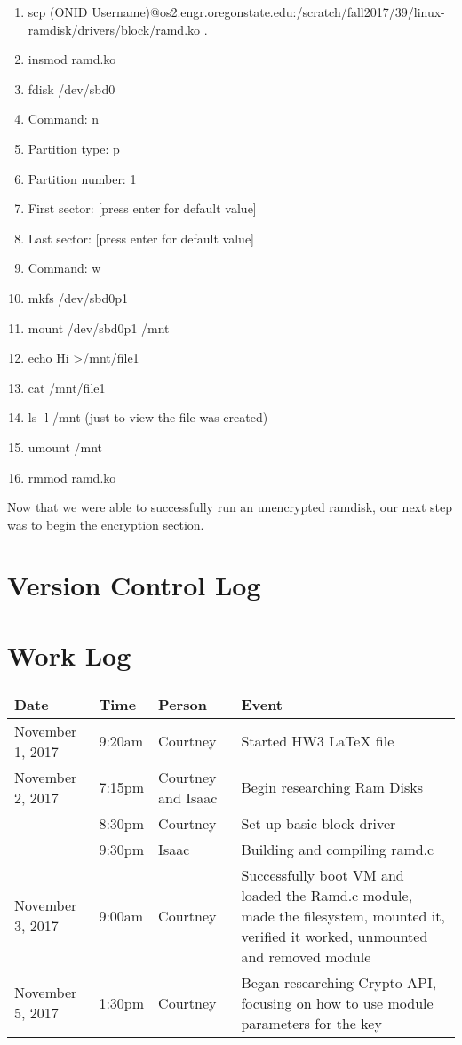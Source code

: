 \documentclass[letterpaper,10pt,draftclsnofoot,onecolumn,titlepage]{IEEEtran}
\begin{document}
	\begin{enumerate}
		\item scp (ONID Username)@os2.engr.oregonstate.edu:/scratch/fall2017/39/linux-ramdisk/drivers/block/ramd.ko .
		\item insmod ramd.ko
		\item fdisk /dev/sbd0

		\item Command: n
		\item Partition type: p
		\item Partition number: 1
		\item First sector: [press enter for default value]
		\item Last sector: [press enter for default value]

		\item Command: w

		\item mkfs /dev/sbd0p1
		\item mount /dev/sbd0p1 /mnt
		\item echo Hi \textgreater /mnt/file1
		\item cat /mnt/file1
		\item ls -l /mnt (just to view the file was created)
		\item umount /mnt
		\item rmmod ramd.ko 
	\end{enumerate}

Now that we were able to successfully run an unencrypted ramdisk, our next step was to begin the encryption section. 

\section{Version Control Log}

\section{Work Log}
\begin{center}
\begin{tabular}{p{3cm}p{1cm}p{1cm}p{10cm} }
 Date  & Time & Person & Event \\ \hline
November 1, 2017 & 9:20am & Courtney & Started HW3 LaTeX file \\
November 2, 2017 & 7:15pm & Courtney and Isaac & Begin researching Ram Disks \\
		 & 8:30pm & Courtney & Set up basic block driver \\
		 & 9:30pm & Isaac & Building and compiling ramd.c \\
November 3, 2017 & 9:00am & Courtney & Successfully boot VM and loaded the Ramd.c module, made the filesystem, mounted it, verified it worked, unmounted and removed module \\
November 5, 2017 & 1:30pm & Courtney & Began researching Crypto API, focusing on how to use module parameters for the key \\
\end{tabular}
\end{center}
\end{document}
